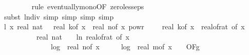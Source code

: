 \begin{isabellebody}
\ \ \ \ \ \ \ \isamarkupfalse%
\ {\isacharparenleft}{\kern0pt}rule\ eventually{\isacharunderscore}{\kern0pt}mono{\isacharbrackleft}{\kern0pt}OF\ zero{\isacharunderscore}{\kern0pt}less{\isacharunderscore}{\kern0pt}eps{\isacharbrackright}{\kern0pt}{\isacharparenright}{\kern0pt}\isanewline
\ \ \ \ \isamarkupfalse%
\ {\isacharparenleft}{\kern0pt}subst\ ln{\isacharunderscore}{\kern0pt}div{\isacharcomma}{\kern0pt}\ simp{\isacharcomma}{\kern0pt}\ simp{\isacharcomma}{\kern0pt}\ simp{\isacharcomma}{\kern0pt}\ simp{\isacharparenright}{\kern0pt}\isanewline
\isanewline
\ \ \isamarkupfalse%
\ l{}{\isacharcolon}{\kern0pt}\ {\isachardoublequoteopen}{\isacharparenleft}{\kern0pt}{\isasymlambda}x{\isachardot}{\kern0pt}\ real\ {\isacharparenleft}{\kern0pt}nat\ {\isasymlceil}{}\ {\isacharasterisk}{\kern0pt}\ real\ {\isacharparenleft}{\kern0pt}k{\isacharunderscore}{\kern0pt}of\ x{\isacharparenright}{\kern0pt}\ {\isacharasterisk}{\kern0pt}\ real\ {\isacharparenleft}{\kern0pt}n{\isacharunderscore}{\kern0pt}of\ x{\isacharparenright}{\kern0pt}\ powr\ {\isacharparenleft}{\kern0pt}{}\ {\isacharminus}{\kern0pt}\ {}\ {\isacharslash}{\kern0pt}\ real\ {\isacharparenleft}{\kern0pt}k{\isacharunderscore}{\kern0pt}of\ x{\isacharparenright}{\kern0pt}{\isacharparenright}{\kern0pt}\ {\isacharslash}{\kern0pt}\ {\isacharparenleft}{\kern0pt}real{\isacharunderscore}{\kern0pt}of{\isacharunderscore}{\kern0pt}rat\ {\isacharparenleft}{\kern0pt}{\isasymdelta}{\isacharunderscore}{\kern0pt}of\ x{\isacharparenright}{\kern0pt}{\isacharparenright}{\kern0pt}\ {\isacharasterisk}{\kern0pt}\isanewline
\ \ \ \ \ \ \ \ \ \ real\ {\isacharparenleft}{\kern0pt}nat\ {\isasymlceil}{\isacharminus}{\kern0pt}\ {\isacharparenleft}{\kern0pt}{}{}\ {\isacharasterisk}{\kern0pt}\ ln\ {\isacharparenleft}{\kern0pt}real{\isacharunderscore}{\kern0pt}of{\isacharunderscore}{\kern0pt}rat\ {\isacharparenleft}{\kern0pt}{\isasymepsilon}{\isacharunderscore}{\kern0pt}of\ x{\isacharparenright}{\kern0pt}{\isacharparenright}{\kern0pt}{\isacharparenright}{\kern0pt}{\isasymrceil}{\isacharparenright}{\kern0pt}\ {\isacharasterisk}{\kern0pt}\isanewline
\ \ \ \ \ \ \ \ \ \ {\isacharparenleft}{\kern0pt}{}\ {\isacharplus}{\kern0pt}\ {}\ {\isacharasterisk}{\kern0pt}\ log\ {}\ {\isacharparenleft}{\kern0pt}real\ {\isacharparenleft}{\kern0pt}n{\isacharunderscore}{\kern0pt}of\ x{\isacharparenright}{\kern0pt}\ {\isacharplus}{\kern0pt}\ {}{\isacharparenright}{\kern0pt}\ {\isacharplus}{\kern0pt}\ {}\ {\isacharasterisk}{\kern0pt}\ log\ {}\ {\isacharparenleft}{\kern0pt}real\ {\isacharparenleft}{\kern0pt}m{\isacharunderscore}{\kern0pt}of\ x{\isacharparenright}{\kern0pt}\ {\isacharplus}{\kern0pt}\ {}{\isacharparenright}{\kern0pt}{\isacharparenright}{\kern0pt}{\isacharparenright}{\kern0pt}\ {\isasymin}\ O{\isacharbrackleft}{\kern0pt}{\isacharquery}{\kern0pt}F{\isacharbrackright}{\kern0pt}{\isacharparenleft}{\kern0pt}g{\isacharparenright}{\kern0pt}{\isachardoublequoteclose}\isanewline

\end{isabellebody}
